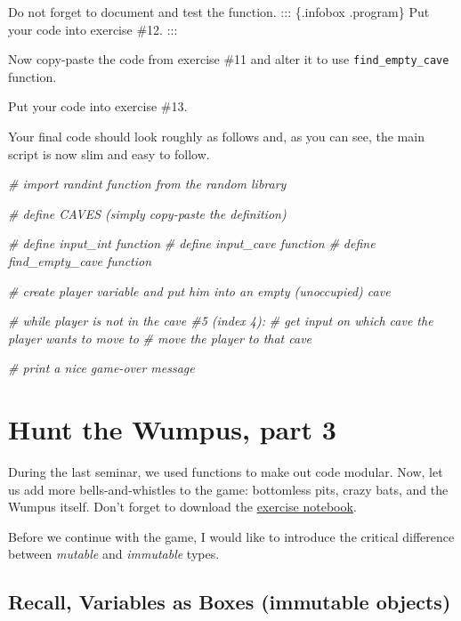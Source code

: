 \documentclass[
]{book}
\newenvironment{Shaded}{\begin{snugshade}}{\end{snugshade}}
\newcommand{\CommentTok}[1]{\textcolor[rgb]{0.56,0.35,0.01}{\textit{#1}}}
\begin{document}
Do not forget to document and test the function.
::: \{.infobox .program\}
Put your code into exercise \#12.
:::

Now copy-paste the code from exercise \#11 and alter it to use \texttt{find\_empty\_cave} function.

Put your code into exercise \#13.

Your final code should look roughly as follows and, as you can see, the main script is now slim and easy to follow.

\begin{Shaded}
\begin{Highlighting}[]
\CommentTok{\# import randint function from the random library}

\CommentTok{\# define CAVES (simply copy{-}paste the definition)}

\CommentTok{\# define input\_int function}
\CommentTok{\# define input\_cave function}
\CommentTok{\# define find\_empty\_cave function}

\CommentTok{\# create \textasciigrave{}player\textasciigrave{} variable and put him into an empty (unoccupied) cave}

\CommentTok{\# while player is not in the cave \#5 (index 4):}
    \CommentTok{\# get input on which cave the player wants to move to}
    \CommentTok{\# move the player to that cave}

\CommentTok{\# print a nice game{-}over message}
\end{Highlighting}
\end{Shaded}

\hypertarget{seminar06}{%
\chapter{Hunt the Wumpus, part 3}\label{seminar06}}

During the last seminar, we used functions to make out code modular. Now, let us add more bells-and-whistles to the game: bottomless pits, crazy bats, and the Wumpus itself. Don't forget to download the \href{notebooks/Seminar\%2006.\%20Hunt\%20the\%20Wumpus,\%20part\%203.ipynb}{exercise notebook}.

Before we continue with the game, I would like to introduce the critical difference between \emph{mutable} and \emph{immutable} types.

\hypertarget{recall-variables-as-boxes-immutable-objects}{%
\section{Recall, Variables as Boxes (immutable objects)}\label{recall-variables-as-boxes-immutable-objects}}
\end{document}
